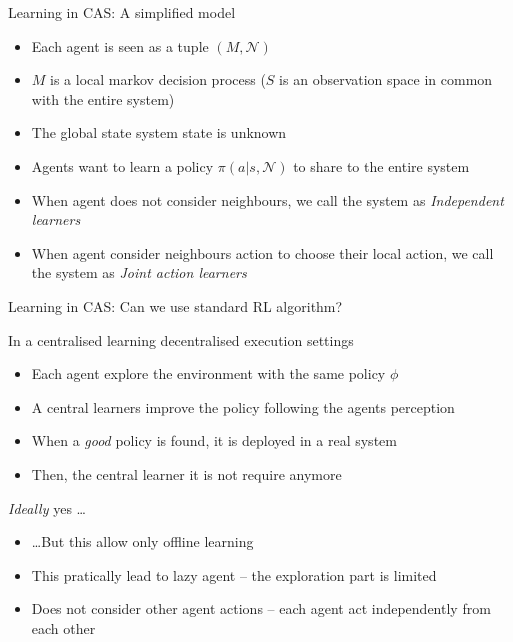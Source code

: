 \documentclass[presentation]{beamer}\mode<presentation>{\usetheme{AMSBolognaFC}}
\begin{document}
\begin{frame}{Learning in CAS: A simplified model}
	\begin{exampleblock}{}		
		\begin{itemize}
			\item Each agent is seen as a tuple $(M, \mathcal{N})$
			\item $M$ is a local markov decision process ($S$ is an observation space in common with the entire system)
			\item The global state system state is unknown
			\item Agents want to learn a policy $\pi(a | s, \mathcal{N})$ to share to the entire system
			\item When agent does not consider neighbours, we call the system as \emph{Independent learners}
			\item When agent consider neighbours action to choose their local action, we call the system as \emph{Joint action learners} 
		
		\end{itemize}
	\end{exampleblock}
\end{frame}

\begin{frame}{Learning in CAS: Can we use standard RL algorithm?}
	\begin{exampleblock}{In a centralised learning decentralised execution settings}
		\begin{itemize}
			\item Each agent explore the environment with the same policy $\phi$
			\item A central learners improve the policy following the agents perception
			\item When a \emph{good} policy is found, it is deployed in a real system
			\item Then, the central learner it is not require anymore

		\end{itemize}
	\end{exampleblock}
	\begin{exampleblock}{\emph{Ideally} yes \dots}
		\begin{itemize}
			\item \dots But this allow only offline learning
			\item This pratically lead to lazy agent -- the exploration part is limited 
			\item Does not consider other agent actions -- each agent act independently from each other
		\end{itemize}
	\end{exampleblock}
\end{frame}
\end{document}
